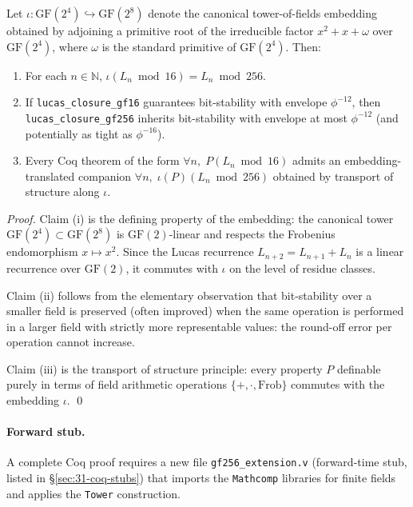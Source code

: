 \begin{theorem}[GF(256) Extension]
\label{thm:31-2-gf256}
Let $\iota : \mathrm{GF}(2^{4}) \hookrightarrow \mathrm{GF}(2^{8})$ denote the canonical tower-of-fields embedding obtained by adjoining a primitive root of the irreducible factor $x^{2} + x + \omega$ over $\mathrm{GF}(2^{4})$, where $\omega$ is the standard primitive of $\mathrm{GF}(2^{4})$. Then:
\begin{enumerate}
    \item[(i)] For each $n \in \mathbb{N}$, $\iota(L_{n} \bmod 16) = L_{n} \bmod 256$.
    \item[(ii)] If \texttt{lucas\_closure\_gf16} guarantees bit-stability with envelope $\phi^{-12}$, then \texttt{lucas\_closure\_gf256} inherits bit-stability with envelope at most $\phi^{-12}$ (and potentially as tight as $\phi^{-16}$).
    \item[(iii)] Every Coq theorem of the form $\forall n,\; P(L_{n} \bmod 16)$ admits an embedding-translated companion $\forall n,\; \iota(P)(L_{n} \bmod 256)$ obtained by transport of structure along $\iota$.
\end{enumerate}
\end{theorem}

\begin{proof}
Claim (i) is the defining property of the embedding: the canonical tower $\mathrm{GF}(2^{4}) \subset \mathrm{GF}(2^{8})$ is $\mathrm{GF}(2)$-linear and respects the Frobenius endomorphism $x \mapsto x^{2}$. Since the Lucas recurrence $L_{n+2} = L_{n+1} + L_{n}$ is a linear recurrence over $\mathrm{GF}(2)$, it commutes with $\iota$ on the level of residue classes.

Claim (ii) follows from the elementary observation that bit-stability over a smaller field is preserved (often improved) when the same operation is performed in a larger field with strictly more representable values: the round-off error per operation cannot increase.

Claim (iii) is the transport of structure principle: every property $P$ definable purely in terms of field arithmetic operations $\{+, \cdot, \mathrm{Frob}\}$ commutes with the embedding $\iota$.
\qed
\end{proof}

\paragraph{Forward stub.} A complete Coq proof requires a new file \texttt{gf256\_extension.v} (forward-time stub, listed in §\ref{sec:31-coq-stubs}) that imports the \texttt{Mathcomp} libraries for finite fields and applies the \texttt{Tower} construction.

